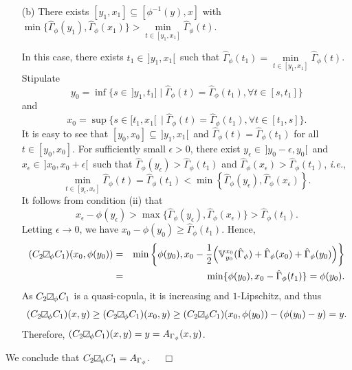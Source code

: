 \documentclass[12pt]{article}
\renewenvironment{proof}{\noindent{\bf Proof.}}{~~$\Box$}
\theoremstyle{plain}
\theoremstyle{definition}
\newcommand{\MySs}{
\begin{tikzpicture}[baseline]
\draw (0,0em) -- (0em,0.6em) -- (0.6em,0.6em) -- (0.6em,0em) -- (0,0em);
\draw (0,0em) parabola (0.6em, 0.6em);
\end{tikzpicture}}
\begin{document}
\begin{proof}
\begin{itemize}
    In this case, there exists $t_0\in [\phi^{-1}(y), x]$ such that $\hat{\Gamma}_\phi(t)$ is increasing on $[\phi^{-1}(y), t_0]$ and decreasing on $[t_0, x]$. Hence,
    \[
    \mathbb{V}_{\phi^{-1}(y)}^x\hat{\Gamma}_\phi(t)=2\hat{\Gamma}_\phi(t_0)-\hat{\Gamma}_\phi(\phi^{-1}(y))-\hat{\Gamma}_\phi(x),
    \]
    which implies that $f_1(x, y)=x-\hat{\Gamma}_\phi(t_0)$ and
    \[
    (C_2\MySs_\phi C_1)(x, y)=\min\{y, x-\hat{\Gamma}_\phi(t_0)\}=\min\{y, x-\max\limits_{t\in[\phi^{-1}(y), x]}\hat{\Gamma}_\phi(t)\}=A_{\Gamma_\phi}(x, y).
    \]

\item[\rm (b)] There exists $[y_1, x_1]\subseteq [\phi^{-1}(y), x]$ with $\min\{\hat{\Gamma}_\phi(y_1), \hat{\Gamma}_\phi(x_1)\}>\min\limits_{t\in[y_1, x_1]}\hat{\Gamma}_\phi(t)$.

    In this case, there exists $t_1\in\,]y_1, x_1[\,$ such that $\hat{\Gamma}_\phi(t_1)=\min\limits_{t\in[y_1, x_1]}\hat{\Gamma}_\phi(t)$. Stipulate
    \[y_0=\inf\{s\in\,]y_1, t_1]\mid \hat{\Gamma}_\phi(t)=\hat{\Gamma}_\phi(t_1), \forall t\in[s, t_1]\}\]
    and
    \[x_0=\sup\{s\in[t_1, x_1[\,\mid \hat{\Gamma}_\phi(t)=\hat{\Gamma}_\phi(t_1), \forall t\in[t_1, s]\}.\]
    It is easy to see that $[y_0, x_0]\subseteq\,]y_1, x_1[\,$ and $\hat{\Gamma}_\phi(t)=\hat{\Gamma}_\phi(t_1)$ for all $t\in [y_0, x_0]$. For sufficiently small $\epsilon>0$, there exist $y_\epsilon\in\,]y_0-\epsilon, y_0[\,$ and $x_\epsilon\in\,]x_0, x_0+\epsilon[\,$ such that $\hat{\Gamma}_\phi(y_\epsilon)>\hat{\Gamma}_\phi(t_1)$ and $\hat{\Gamma}_\phi(x_\epsilon)>\hat{\Gamma}_\phi(t_1)$, \emph{i.e.},
    \[
    \min_{t\in[y_\epsilon, x_\epsilon]}\hat{\Gamma}_\phi(t)=\hat{\Gamma}_\phi(t_1)
    <\min\left\{\hat{\Gamma}_\phi(y_\epsilon), \hat{\Gamma}_\phi(x_\epsilon)\right\}.
    \]
    It follows from condition (ii) that
    \[
    x_\epsilon-\phi(y_\epsilon)>\max\{\hat{\Gamma}_\phi(y_\epsilon), \hat{\Gamma}_\phi(x_\epsilon)\}>\hat{\Gamma}_\phi(t_1).
    \]
    Letting $\epsilon\to 0$, we have $x_0-\phi(y_0)\geq\hat{\Gamma}_\phi(t_1)$.
    Hence,
    \begin{eqnarray*}
    (C_2\MySs_\phi C_1)(x_0, \phi(y_0))&=&\min\left\{\phi(y_0), x_0-\frac{1}{2}\Big(\mathbb{V}_{y_0}^{ x_0}(\hat{\Gamma}_\phi)+\hat{\Gamma}_\phi(x_0)+\hat{\Gamma}_\phi(y_0)\Big)\right\}\\
    &=&\min\{\phi(y_0), x_0-\hat{\Gamma}_\phi(t_1)\}=\phi(y_0).
    \end{eqnarray*}
  As $C_2\MySs_\phi C_1$ is a quasi-copula, it is increasing and $1$-Lipschitz, and thus
   \[
   (C_2\MySs_\phi C_1)(x, y)\geq(C_2\MySs_\phi C_1)(x_0, y)\geq(C_2\MySs_\phi C_1)(x_0, \phi(y_0))-(\phi(y_0)-y)=y.
   \]
  Therefore, $(C_2\MySs_\phi C_1)(x, y)=y=A_{\Gamma_\phi}(x, y)$.
\end{itemize}
We conclude that $C_2\MySs_\phi C_1=A_{\Gamma_\phi}$.
\end{proof}
\end{document}
